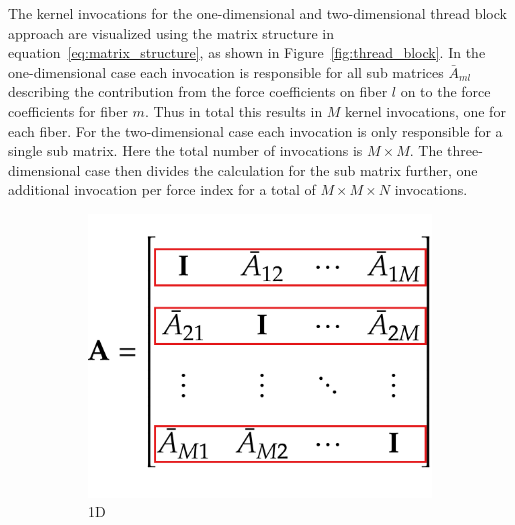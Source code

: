The kernel invocations for the one-dimensional and two-dimensional thread block approach are visualized using the matrix structure in equation~\eqref{eq:matrix_structure}, as shown in Figure~\ref{fig:thread_block}. In the one-dimensional case each invocation is responsible for all sub matrices $\bar{A}_{ml}$ describing the contribution from the force coefficients on fiber $l$ on to the force coefficients for fiber $m$. Thus in total this results in $M$ kernel invocations, one for each fiber. For the two-dimensional case each invocation is only responsible for a single sub matrix. Here the total number of invocations is $M \times M$. The three-dimensional case then divides the calculation for the sub matrix further, one additional invocation per force index for a total of $M \times M \times N$ invocations.

\begin{figure}[!htbp]
  \centering
  \begin{subfigure}[h]{0.33\textwidth}
    \centering
    \includegraphics[width=\textwidth]{img/thread_block1D.pdf}
    \caption{1D}\label{fig:thread_block_1D}
  \end{subfigure}
  \begin{subfigure}[h]{0.33\textwidth}
    \centering

\end{subfigure}
\end{figure}
